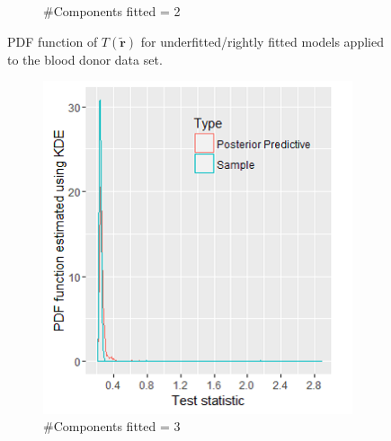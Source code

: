 \begin{figure}[!htb]
\begin{subfigure}[b]{0.4\textwidth}
          \caption{\label{fig : ppc_blood_donor_2comp}\#Components fitted = 2}
	\end{subfigure}
	\caption{PDF function of $T(\boldsymbol{\tilde{r}})$ for underfitted/rightly fitted models applied to the blood donor data set.}
	\label{fig : ppc_blood_donor_underfitted}    
\end{figure} 

\begin{figure}[!htb]
\centering
\captionsetup{justification=centering}
\begin{subfigure}[b]{0.4\textwidth}
		\includegraphics[width=\textwidth]{mainmatter/chapter_6_blood_donor/ppc_3comp.png}	
          \caption{\label{fig : ppc_blood_donor_3comp}\#Components fitted = 3}
	\end{subfigure}
	\begin{subfigure}[b]{0.4\textwidth}

\end{subfigure}
\end{figure}
